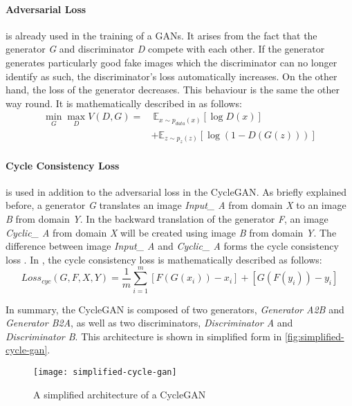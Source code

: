 \documentclass[fleqn,10pt]{SelfArx} %
\begin{document}
\paragraph{Adversarial Loss} is already used in the training of a \ac{GAN}s. It arises from the fact that the generator \textit{G} and discriminator \textit{D} compete with each other. If the generator generates particularly good fake images which the discriminator can no longer identify as such, the discriminator's loss automatically increases. On the other hand, the loss of the generator decreases. This behaviour is the same the other way round. It is mathematically described in \cite{Source-GAN} as follows:
\begin{equation*}
\begin{split}
\min_{G} \max_{D} V(D,G) =&~\mathbb E_{x \sim p_{data}(x)} [\log D(x)] \\\
&+ \mathbb E_{z \sim p_{z}(z)} [\log (1-D(G(z)))]
\end{split}
\end{equation*}

\paragraph{Cycle Consistency Loss} is used in addition to the adversarial loss in the Cycle\ac{GAN}. As briefly explained before, a generator \textit{G} translates an image \textit{Input\_ A} from domain \textit{X} to an image \textit{B} from domain \textit{Y}. In the backward translation of the generator \textit{F}, an image \textit{Cyclic\_ A} from domain \textit{X} will be created using image \textit{B} from domain \textit{Y}. The difference between image \textit{Input\_ A} and \textit{Cyclic\_ A} forms the cycle consistency loss \cite{Introduction-to-Cycle-GANs}. In \cite{Introduction-to-Cycle-GANs}, the cycle consistency loss is mathematically described as follows:
\begin{equation*}
	Loss_{cyc}(G,F,X,Y) = \frac{1}{m} \sum^{m}_{i=1}[F(G(x_i))-x_i]+[G(F(y_i))-y_i]
\end{equation*}

In summary, the Cycle\ac{GAN} is composed of two generators, \textit{Generator A2B} and \textit{Generator B2A}, as well as two discriminators, \textit{Discriminator A} and \textit{Discriminator B}. This architecture is shown in simplified form in \autoref{fig:simplified-cycle-gan}.

\begin{figure}[htb] 
	\centering 
	\texttt{[image: simplified-cycle-gan]}
	\caption{A simplified architecture of a Cycle\ac{GAN} \cite{Introduction-to-Cycle-GANs}}
	\label{fig:simplified-cycle-gan}
\end{figure}
\end{document}
